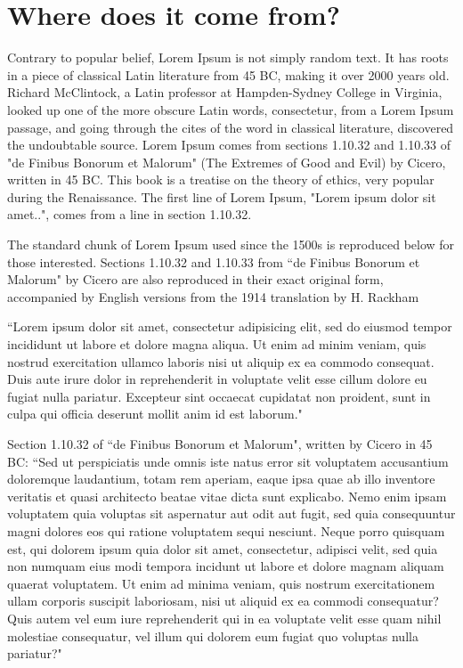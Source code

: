 \documentclass[openright]{book} %
\begin{document}
\section{Where does it come from?}  %

Contrary to popular belief, Lorem Ipsum is not simply random text. It has roots in a piece of classical Latin literature from 45 BC, making it over 2000 years old. Richard McClintock, a Latin professor at Hampden-Sydney College in Virginia, looked up one of the more obscure Latin words, consectetur, from a Lorem Ipsum passage, and going through the cites of the word in classical literature, discovered the undoubtable source. Lorem Ipsum comes from sections 1.10.32 and 1.10.33 of "de Finibus Bonorum et Malorum" (The Extremes of Good and Evil) by Cicero, written in 45 BC. This book is a treatise on the theory of ethics, very popular during the Renaissance. The first line of Lorem Ipsum, "Lorem ipsum dolor sit amet..", comes from a line in section 1.10.32.

The standard chunk of Lorem Ipsum used since the 1500s is reproduced below for those interested. Sections 1.10.32 and 1.10.33 from ``de Finibus Bonorum et Malorum" by Cicero are also reproduced in their exact original form, accompanied by English versions from the 1914 translation by H. Rackham

``Lorem ipsum dolor sit amet, consectetur adipisicing elit, sed do eiusmod tempor incididunt ut labore et dolore magna aliqua. Ut enim ad minim veniam, quis nostrud exercitation ullamco laboris nisi ut aliquip ex ea commodo consequat. Duis aute irure dolor in reprehenderit in voluptate velit esse cillum dolore eu fugiat nulla pariatur. Excepteur sint occaecat cupidatat non proident, sunt in culpa qui officia deserunt mollit anim id est laborum."

Section 1.10.32 of ``de Finibus Bonorum et Malorum", written by Cicero in 45 BC: ``Sed ut perspiciatis unde omnis iste natus error sit voluptatem accusantium doloremque laudantium, totam rem aperiam, eaque ipsa quae ab illo inventore veritatis et quasi architecto beatae vitae dicta sunt explicabo. Nemo enim ipsam voluptatem quia voluptas sit aspernatur aut odit aut fugit, sed quia consequuntur magni dolores eos qui ratione voluptatem sequi nesciunt. Neque porro quisquam est, qui dolorem ipsum quia dolor sit amet, consectetur, adipisci velit, sed quia non numquam eius modi tempora incidunt ut labore et dolore magnam aliquam quaerat voluptatem. Ut enim ad minima veniam, quis nostrum exercitationem ullam corporis suscipit laboriosam, nisi ut aliquid ex ea commodi consequatur? Quis autem vel eum iure reprehenderit qui in ea voluptate velit esse quam nihil molestiae consequatur, vel illum qui dolorem eum fugiat quo voluptas nulla pariatur?"
\end{document}
